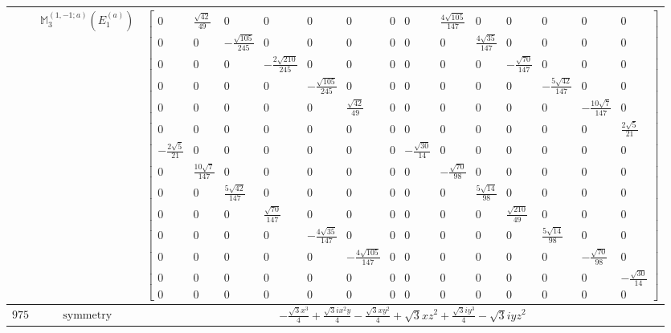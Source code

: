 \documentclass[fleqn,8pt,landscape]{jsarticle}
\begin{document}
\begin{longtable}{ccc}
$  $ & $ \mathbb{M}_{3}^{(1,-1;a)}(E_{1}^{(a)}) $ & $ \begin{bmatrix} 0 & \frac{\sqrt{42}}{49} & 0 & 0 & 0 & 0 & 0 & 0 & \frac{4 \sqrt{105}}{147} & 0 & 0 & 0 & 0 & 0 \\ 0 & 0 & - \frac{\sqrt{105}}{245} & 0 & 0 & 0 & 0 & 0 & 0 & \frac{4 \sqrt{35}}{147} & 0 & 0 & 0 & 0 \\ 0 & 0 & 0 & - \frac{2 \sqrt{210}}{245} & 0 & 0 & 0 & 0 & 0 & 0 & - \frac{\sqrt{70}}{147} & 0 & 0 & 0 \\ 0 & 0 & 0 & 0 & - \frac{\sqrt{105}}{245} & 0 & 0 & 0 & 0 & 0 & 0 & - \frac{5 \sqrt{42}}{147} & 0 & 0 \\ 0 & 0 & 0 & 0 & 0 & \frac{\sqrt{42}}{49} & 0 & 0 & 0 & 0 & 0 & 0 & - \frac{10 \sqrt{7}}{147} & 0 \\ 0 & 0 & 0 & 0 & 0 & 0 & 0 & 0 & 0 & 0 & 0 & 0 & 0 & \frac{2 \sqrt{5}}{21} \\ - \frac{2 \sqrt{5}}{21} & 0 & 0 & 0 & 0 & 0 & 0 & - \frac{\sqrt{30}}{14} & 0 & 0 & 0 & 0 & 0 & 0 \\ 0 & \frac{10 \sqrt{7}}{147} & 0 & 0 & 0 & 0 & 0 & 0 & - \frac{\sqrt{70}}{98} & 0 & 0 & 0 & 0 & 0 \\ 0 & 0 & \frac{5 \sqrt{42}}{147} & 0 & 0 & 0 & 0 & 0 & 0 & \frac{5 \sqrt{14}}{98} & 0 & 0 & 0 & 0 \\ 0 & 0 & 0 & \frac{\sqrt{70}}{147} & 0 & 0 & 0 & 0 & 0 & 0 & \frac{\sqrt{210}}{49} & 0 & 0 & 0 \\ 0 & 0 & 0 & 0 & - \frac{4 \sqrt{35}}{147} & 0 & 0 & 0 & 0 & 0 & 0 & \frac{5 \sqrt{14}}{98} & 0 & 0 \\ 0 & 0 & 0 & 0 & 0 & - \frac{4 \sqrt{105}}{147} & 0 & 0 & 0 & 0 & 0 & 0 & - \frac{\sqrt{70}}{98} & 0 \\ 0 & 0 & 0 & 0 & 0 & 0 & 0 & 0 & 0 & 0 & 0 & 0 & 0 & - \frac{\sqrt{30}}{14} \\ 0 & 0 & 0 & 0 & 0 & 0 & 0 & 0 & 0 & 0 & 0 & 0 & 0 & 0 \end{bmatrix} $ \\ \hline
$ 975 $ & $ \text{symmetry} $ & $ - \frac{\sqrt{3} x^{3}}{4} + \frac{\sqrt{3} i x^{2} y}{4} - \frac{\sqrt{3} x y^{2}}{4} + \sqrt{3} x z^{2} + \frac{\sqrt{3} i y^{3}}{4} - \sqrt{3} i y z^{2} $ \\

\end{longtable}
\end{document}
